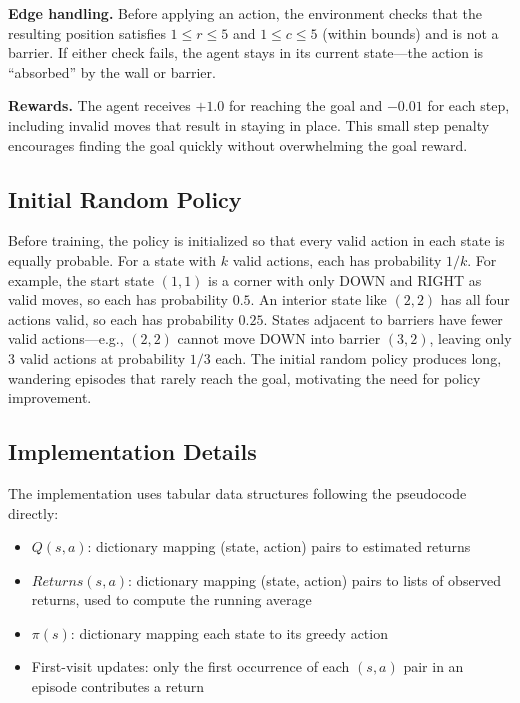 \documentclass[letterpaper]{article}
\begin{document}
\textbf{Edge handling.} Before applying an action, the environment checks that the resulting position satisfies $1 \leq r \leq 5$ and $1 \leq c \leq 5$ (within bounds) and is not a barrier. If either check fails, the agent stays in its current state---the action is ``absorbed'' by the wall or barrier.

\textbf{Rewards.} The agent receives $+1.0$ for reaching the goal and $-0.01$ for each step, including invalid moves that result in staying in place. This small step penalty encourages finding the goal quickly without overwhelming the goal reward.

\subsection{Initial Random Policy}

Before training, the policy is initialized so that every valid action in each state is equally probable. For a state with $k$ valid actions, each has probability $1/k$. For example, the start state $(1,1)$ is a corner with only DOWN and RIGHT as valid moves, so each has probability $0.5$. An interior state like $(2,2)$ has all four actions valid, so each has probability $0.25$. States adjacent to barriers have fewer valid actions---e.g., $(2,2)$ cannot move DOWN into barrier $(3,2)$, leaving only 3 valid actions at probability $1/3$ each. The initial random policy produces long, wandering episodes that rarely reach the goal, motivating the need for policy improvement.

\subsection{Implementation Details}

The implementation uses tabular data structures following the pseudocode directly:
\begin{itemize}
    \item $Q(s,a)$: dictionary mapping (state, action) pairs to estimated returns
    \item $Returns(s,a)$: dictionary mapping (state, action) pairs to lists of observed returns, used to compute the running average
    \item $\pi(s)$: dictionary mapping each state to its greedy action
    \item First-visit updates: only the first occurrence of each $(s,a)$ pair in an episode contributes a return
\end{itemize}
\end{document}
